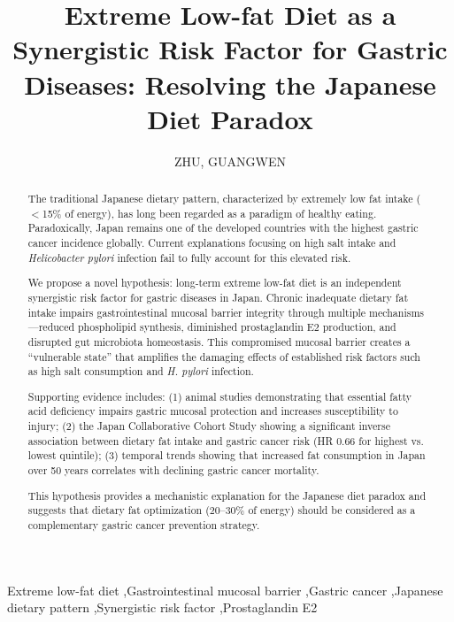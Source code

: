 \documentclass[review]{elsarticle}
\begin{document}
\begin{frontmatter}

\title{Extreme Low-fat Diet as a Synergistic Risk Factor for Gastric Diseases: Resolving the Japanese Diet Paradox}

\author[inst1]{ZHU, GUANGWEN}



\begin{abstract}
The traditional Japanese dietary pattern, characterized by extremely low fat intake ($<$15\% of energy), has long been regarded as a paradigm of healthy eating. Paradoxically, Japan remains one of the developed countries with the highest gastric cancer incidence globally. Current explanations focusing on high salt intake and \textit{Helicobacter pylori} infection fail to fully account for this elevated risk. 

We propose a novel hypothesis: long-term extreme low-fat diet is an independent synergistic risk factor for gastric diseases in Japan. Chronic inadequate dietary fat intake impairs gastrointestinal mucosal barrier integrity through multiple mechanisms---reduced phospholipid synthesis, diminished prostaglandin E2 production, and disrupted gut microbiota homeostasis. This compromised mucosal barrier creates a ``vulnerable state'' that amplifies the damaging effects of established risk factors such as high salt consumption and \textit{H. pylori} infection.

Supporting evidence includes: (1) animal studies demonstrating that essential fatty acid deficiency impairs gastric mucosal protection and increases susceptibility to injury; (2) the Japan Collaborative Cohort Study showing a significant inverse association between dietary fat intake and gastric cancer risk (HR 0.66 for highest vs. lowest quintile); (3) temporal trends showing that increased fat consumption in Japan over 50 years correlates with declining gastric cancer mortality. 

This hypothesis provides a mechanistic explanation for the Japanese diet paradox and suggests that dietary fat optimization (20--30\% of energy) should be considered as a complementary gastric cancer prevention strategy.
\end{abstract}

\begin{keyword}
Extreme low-fat diet \sep Gastrointestinal mucosal barrier \sep Gastric cancer \sep Japanese dietary pattern \sep Synergistic risk factor \sep Prostaglandin E2
\end{keyword}

\end{frontmatter}
\end{document}
